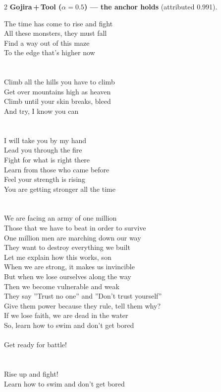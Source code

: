 \begin{multicols}{2}
\nopagebreak\noindent\textbf{Gojira\,+\,Tool ($\alpha{=}0.5$) --- the anchor holds} (attributed 0.991).\par\nopagebreak\vspace{4pt}
{\footnotesize\itshape\raggedright
The time has come to rise and fight \\
All these monsters, they must fall \\
Find a way out of this maze \\
To the edge that's higher now \\
\mbox{} \\
\mbox{} \\
Climb all the hills you have to climb \\
Get over mountains high as heaven \\
Climb until your skin breaks, bleed \\
And try, I know you can \\
\mbox{} \\
\mbox{} \\
I will take you by my hand \\
Lead you through the fire \\
Fight for what is right there \\
Learn from those who came before \\
Feel your strength is rising \\
You are getting stronger all the time \\
\mbox{} \\
\mbox{} \\
We are facing an army of one million \\
Those that we have to beat in order to survive \\
One million men are marching down our way \\
They want to destroy everything we built \\
Let me explain how this works, son \\
When we are strong, it makes us invincible \\
But when we lose ourselves along the way \\
Then we become vulnerable and weak \\
They say ''Trust no one'' and ''Don't trust yourself'' \\
Give them power because they rule, tell them why? \\
If we lose faith, we are dead in the water \\
So, learn how to swim and don't get bored \\
\mbox{} \\
Get ready for battle! \\
\mbox{} \\
\mbox{} \\
Rise up and fight! \\
Learn how to swim and don't get bored\par}
\medskip


\end{multicols}
